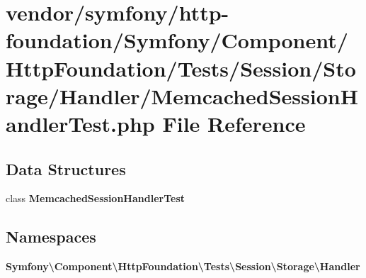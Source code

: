 \section{vendor/symfony/http-\/foundation/\+Symfony/\+Component/\+Http\+Foundation/\+Tests/\+Session/\+Storage/\+Handler/\+Memcached\+Session\+Handler\+Test.php File Reference}
\label{_memcached_session_handler_test_8php}
\subsection*{Data Structures}
\begin{DoxyCompactItemize}
\item 
class {\bf Memcached\+Session\+Handler\+Test}
\end{DoxyCompactItemize}
\subsection*{Namespaces}
\begin{DoxyCompactItemize}
\item 
 {\bf Symfony\textbackslash{}\+Component\textbackslash{}\+Http\+Foundation\textbackslash{}\+Tests\textbackslash{}\+Session\textbackslash{}\+Storage\textbackslash{}\+Handler}
\end{DoxyCompactItemize}
